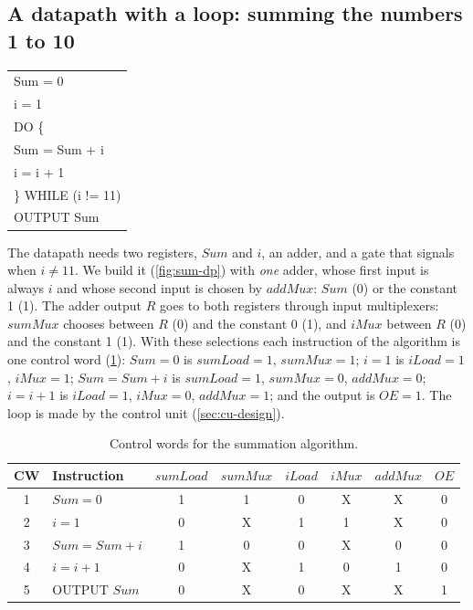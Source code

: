 \subsection{A datapath with a loop: summing the numbers 1 to 10}
\begin{center}\ttfamily\small
\begin{tabular}{@{}l@{}}
Sum = 0\\ i = 1\\ DO \{\\ \quad Sum = Sum + i\\ \quad i = i + 1\\ \} WHILE (i != 11)\\ OUTPUT Sum
\end{tabular}
\end{center}
The datapath needs two registers, $Sum$ and $i$, an adder, and a gate that signals when $i\neq11$. We build it (\cref{fig:sum-dp}) with \emph{one} adder, whose first input is always $i$ and whose second input is chosen by $\mathit{addMux}$: $Sum$ (0) or the constant 1 (1). The adder output $R$ goes to both registers through input multiplexers: $\mathit{sumMux}$ chooses between $R$ (0) and the constant 0 (1), and $\mathit{iMux}$ between $R$ (0) and the constant 1 (1). With these selections each instruction of the algorithm is one control word (\cref{tab:cw-sum}): $Sum=0$ is $sumLoad=1$, $sumMux=1$; $i=1$ is $iLoad=1$, $iMux=1$; $Sum=Sum+i$ is $sumLoad=1$, $sumMux=0$, $addMux=0$; $i=i+1$ is $iLoad=1$, $iMux=0$, $addMux=1$; and the output is $OE=1$. The loop is made by the control unit (\cref{sec:cu-design}).


\begin{table}[htbp]
\centering
\caption{Control words for the summation algorithm.}
\label{tab:cw-sum}
\begin{tabular}{cl|cccccc}
\toprule CW & Instruction & $sumLoad$ & $sumMux$ & $iLoad$ & $iMux$ & $addMux$ & $OE$\\ \midrule
1 & $Sum=0$ & 1 & 1 & 0 & X & X & 0\\
2 & $i=1$ & 0 & X & 1 & 1 & X & 0\\
3 & $Sum=Sum+i$ & 1 & 0 & 0 & X & 0 & 0\\
4 & $i=i+1$ & 0 & X & 1 & 0 & 1 & 0\\
5 & OUTPUT $Sum$ & 0 & X & 0 & X & X & 1\\ \bottomrule
\end{tabular}
\end{table}

